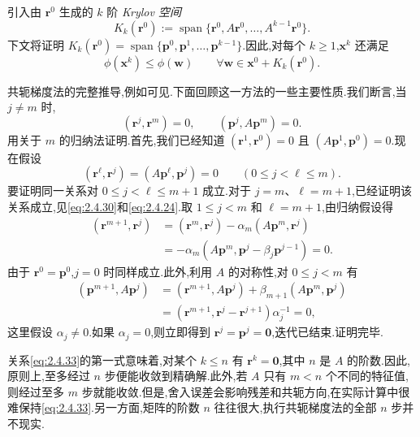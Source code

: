 引入由 \(\boldsymbol{r}^0\) 生成的 \(k\) 阶 \emph{Krylov 空间}
\begin{equation}\label{eq:2.4.32}
  K_k(\boldsymbol{r}^0):=\operatorname{span}\{\boldsymbol{r}^0,A\boldsymbol{r}^0,\ldots,A^{k-1}\boldsymbol{r}^0\}.
\end{equation}
下文将证明 \(K_k(\boldsymbol{r}^0)=\operatorname{span}\{\boldsymbol{p}^0,\boldsymbol{p}^1,\ldots,\boldsymbol{p}^{k-1}\}\).因此,对每个 \(k\ge1\),\(\boldsymbol{x}^k\) 还满足
\[
  \phi(\boldsymbol{x}^k)\le\phi(\boldsymbol{w})\qquad \forall\boldsymbol{w}\in\boldsymbol{x}^0+K_k(\boldsymbol{r}^0).
\]

共轭梯度法的完整推导,例如可见.下面回顾这一方法的一些主要性质.我们断言,当 \(j\ne m\) 时,
\begin{equation}\label{eq:2.4.33}
  (\boldsymbol{r}^j,\boldsymbol{r}^m)=0,\qquad
  (\boldsymbol{p}^j,A\boldsymbol{p}^m)=0.
\end{equation}
用关于 \(m\) 的归纳法证明.首先,我们已经知道 \((\boldsymbol{r}^1,\boldsymbol{r}^0)=0\) 且 \((A\boldsymbol{p}^1,\boldsymbol{p}^0)=0\).现在假设
\[
  (\boldsymbol{r}^{\ell},\boldsymbol{r}^j)=(A\boldsymbol{p}^{\ell},\boldsymbol{p}^j)=0
  \qquad (0\le j<\ell\le m).
\]
要证明同一关系对 \(0\le j<\ell\le m+1\) 成立.对于 \(j=m\)、\(\ell=m+1\),已经证明该关系成立,见\eqref{eq:2.4.30}和\eqref{eq:2.4.24}.取 \(1\le j<m\) 和 \(\ell=m+1\),由归纳假设得
\[
  \begin{aligned}
    (\boldsymbol{r}^{m+1},\boldsymbol{r}^j)
     &=(\boldsymbol{r}^m,\boldsymbol{r}^j)-\alpha_m(A\boldsymbol{p}^m,\boldsymbol{r}^j)\\
     &=-\alpha_m(A\boldsymbol{p}^m,\boldsymbol{p}^j-\beta_j\boldsymbol{p}^{j-1})=0.
  \end{aligned}
\]
由于 \(\boldsymbol{r}^0=\boldsymbol{p}^0\),\(j=0\) 时同样成立.此外,利用 \(A\) 的对称性,对 \(0\le j<m\) 有
\[
  \begin{aligned}
    (\boldsymbol{p}^{m+1},A\boldsymbol{p}^j)
      &=(\boldsymbol{r}^{m+1},A\boldsymbol{p}^j)+\beta_{m+1}(A\boldsymbol{p}^m,\boldsymbol{p}^j)\\
      &=(\boldsymbol{r}^{m+1},\boldsymbol{r}^j-\boldsymbol{r}^{j+1})\alpha_j^{-1}=0,
  \end{aligned}
\]
这里假设 \(\alpha_j\ne0\).如果 \(\alpha_j=0\),则立即得到 \(\boldsymbol{r}^j=\boldsymbol{p}^j=\boldsymbol{0}\),迭代已结束.证明完毕.

关系\eqref{eq:2.4.33}的第一式意味着,对某个 \(k\le n\) 有 \(\boldsymbol{r}^k=\boldsymbol{0}\),其中 \(n\) 是 \(A\) 的阶数.因此,原则上,至多经过 \(n\) 步便能收敛到精确解.此外,若 \(A\) 只有 \(m<n\) 个不同的特征值,则经过至多 \(m\) 步就能收敛.但是,舍入误差会影响残差和共轭方向,在实际计算中很难保持\eqref{eq:2.4.33}.另一方面,矩阵的阶数 \(n\) 往往很大,执行共轭梯度法的全部 \(n\) 步并不现实.

